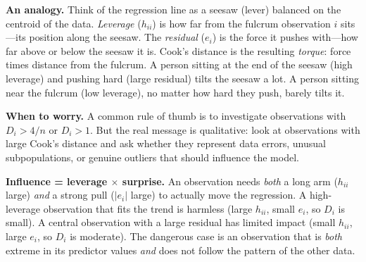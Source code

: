 \medskip
\noindent\textbf{An analogy.}
Think of the regression line as a seesaw (lever) balanced on the centroid of the data.
\emph{Leverage} ($h_{ii}$) is how far from the fulcrum observation $i$ sits---its position along the seesaw.
The \emph{residual} ($e_i$) is the force it pushes with---how far above or below the seesaw it is.
Cook's distance is the resulting \emph{torque}: force times distance from the fulcrum.
A person sitting at the end of the seesaw (high leverage) and pushing hard (large residual) tilts the seesaw a lot. A person sitting near the fulcrum (low leverage), no matter how hard they push, barely tilts it.

\medskip
\noindent\textbf{When to worry.}
A common rule of thumb is to investigate observations with $D_i > 4/n$ or $D_i > 1$.
But the real message is qualitative: look at observations with large Cook's distance
and ask whether they represent data errors, unusual subpopulations, or genuine outliers
that should influence the model.

\begin{keyinsight}
\textbf{Influence = leverage $\times$ surprise.}
An observation needs \emph{both} a long arm ($h_{ii}$ large) \emph{and}
a strong pull ($|e_i|$ large) to actually move the regression.
A high-leverage observation that fits the trend is harmless
(large $h_{ii}$, small $e_i$, so $D_i$ is small).
A central observation with a large residual has limited impact
(small $h_{ii}$, large $e_i$, so $D_i$ is moderate).
The dangerous case is an observation that is \emph{both} extreme in its
predictor values \emph{and} does not follow the pattern of the other data.
\end{keyinsight}


